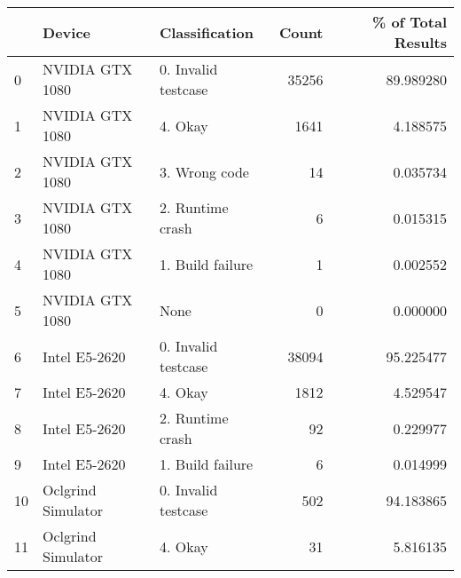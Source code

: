 \begin{tabular}{lllrr}
\toprule
{} &              Device &       Classification &  Count &  \% of Total Results \\
\midrule
0  &     NVIDIA GTX 1080 &  0. Invalid testcase &  35256 &           89.989280 \\
1  &     NVIDIA GTX 1080 &              4. Okay &   1641 &            4.188575 \\
2  &     NVIDIA GTX 1080 &        3. Wrong code &     14 &            0.035734 \\
3  &     NVIDIA GTX 1080 &     2. Runtime crash &      6 &            0.015315 \\
4  &     NVIDIA GTX 1080 &     1. Build failure &      1 &            0.002552 \\
5  &     NVIDIA GTX 1080 &                 None &      0 &            0.000000 \\
6  &       Intel E5-2620 &  0. Invalid testcase &  38094 &           95.225477 \\
7  &       Intel E5-2620 &              4. Okay &   1812 &            4.529547 \\
8  &       Intel E5-2620 &     2. Runtime crash &     92 &            0.229977 \\
9  &       Intel E5-2620 &     1. Build failure &      6 &            0.014999 \\
10 &  Oclgrind Simulator &  0. Invalid testcase &    502 &           94.183865 \\
11 &  Oclgrind Simulator &              4. Okay &     31 &            5.816135 \\
\bottomrule
\end{tabular}
